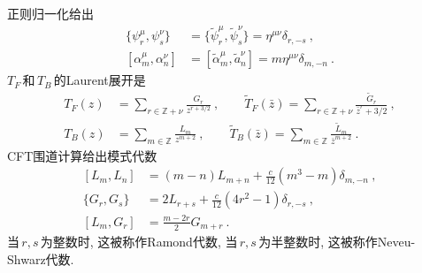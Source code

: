 正则归一化给出
\begin{subequations}
\begin{align}
    \{\psi_{r}^{\mu},\psi_{s}^{\nu}\}&=\{\tilde{\psi}_{r}^{\mu},\tilde{\psi}_{s}^{\nu}\}=\eta^{\mu\nu}\delta_{r,-s}\:,
    \label{10.2.9a} \\
    [\alpha_{m}^{\mu},\alpha_{n}^{\nu}]&=[\tilde{\alpha}_{m}^{\mu},\tilde{a}_{n}^{\nu}]=m\eta^{\mu\nu}\delta_{m,-n}\:.
    \label{10.2.9.b}
\end{align}
\end{subequations}
$T_{F}\,$和$\,T_{B}\,$的Laurent展开是
\begin{subequations}
\begin{align}
    T_{F}(z)&=\sum_{r\in \mathds{Z}+\nu}\frac{G_{r}}{z^{r+3/2}}\:,  \qquad
    \tilde{T}_{F}(\bar{z})=\sum_{r\in \mathds{Z}+\nu}\frac{\tilde{G}_{r}}{\bar{z}^{r}+3/2}\:, \label{10.2.10a}\\
    T_{B}(z)&=\sum_{m\in \mathds{Z}}\frac{L_{m}}{z^{m+2}}\:, \qquad
    \tilde{T}_{B}(\bar{z})=\sum_{m\in \mathds{Z}}\frac{\tilde{L}_{m}}{\bar{z}^{m+2}} \:. \label{10.2.10b}
\end{align} \label{10.2.10}
\end{subequations}
CFT围道计算给出模式代数
\begin{subequations}
\begin{align}
    [L_{m},L_{n}] &=(m-n)L_{m+n}+\frac{c}{12}(m^{3}-m)\delta_{m,-n} \:, \label{10.2.11a} \\
    \{G_{r},G_{s}\} &=2L_{r+s}+\frac{c}{12}(4r^{2}-1)\delta_{r,-s} \:, \label{10.2.11b} \\
    [L_{m},G_{r}] &= \frac{m-2r}{2}G_{m+r} \:. \label{10.2.11c}
\end{align}
\end{subequations}
当$\,r,s\,$为整数时, 这被称作Ramond代数, 当$\,r,s\,$为半整数时, 这被称作Neveu-Shwarz代数.
